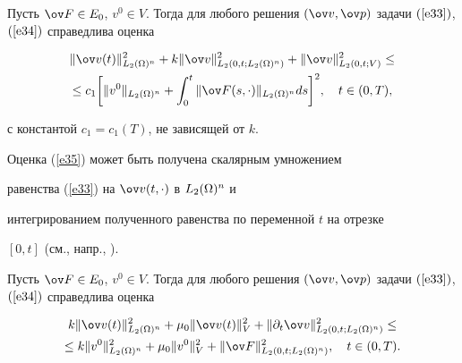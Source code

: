 \begin{lems}


\label{l31}


Пусть $\ov F\in E_0$, $v^0\in V$. Тогда для любого решения $(\ov


v,\ov p)$ задачи $(\ref{e33})$, $(\ref{e34})$ справедлива оценка


\begin{multline}


\label{e35} \|\ov v(t)\|_{L_2(\Om)^n}^2 + k \|\ov


v\|_{L_2(0,t;L_2(\Om)^n)}^2+\|\ov v\|_{L_2(0,t;V)}^2 \le \\ \le


c_1 \bigg[\|v^0\|_{L_2(\Om)^n}+


\intl{0}{t}\|\ov F(s,\cdot)\|_{L_2(\Om)^n} ds\bigg]^2,\quad


t \in (0,T),


\end{multline}


с константой $c_1=c_1(T)$, не зависящей от $k$.


\end{lems}





Оценка (\ref{e35}) может быть получена скалярным умножением


равенства (\ref{e33}) на $\ov v(t,\cdot)$ в $L_2(\Omega)^n$ и


интегрированием полученного равенства по переменной $t$ на отрезке


$[0,t]$ (см., напр., \cite{ZvDm1}).





\begin{lems}


\label{l32}


Пусть $\ov F\in E_0$, $v^0\in V$. Тогда для любого решения $(\ov


v, \ov p)$ задачи $(\ref{e33})$, $(\ref{e34})$ справедлива оценка


\begin{multline}


\label{e36}


k\|\ov v(t)\|_{L_2(\Om)^n}^2 +\mu_0


\|\ov v(t)\|_V^2+ \|\partial_t\ov


v\|_{L_2(0,t;L_2(\Om)^n)}^2\le \\ \le


k\| v^0\|_{L_2(\Om)^n}^2+ \mu_0 \|v^0\|_V^2+\|\ov


F\|_{L_2(0,t;L_2(\Om)^n)}^2,\quad t \in (0,T).


\end{multline}


\end{lems}





